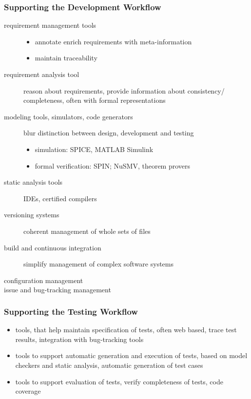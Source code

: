 \documentclass[a4paper, 10pt]{article}
\begin{document}
\subsubsection*{Supporting the Development Workflow}
\begin{description}
    \item[requirement management tools]
    \begin{itemize}
        \item annotate enrich requirements with meta-information
        \item maintain traceability
    \end{itemize}
    \item[requirement analysis tool] reason about requirements, provide information about consistency/ completeness, often with formal representations
    \item[modeling tools, simulators, code generators] blur distinction between design, development and testing
    \begin{itemize}
        \item simulation: SPICE, MATLAB Simulink
        \item formal verification: SPIN; NuSMV, theorem provers
    \end{itemize}
    \item[static analysis tools] IDEs, certified compilers
    \item[versioning systems] coherent management of whole sets of files
    \item[build and continuous integration] simplify management of complex software systems
    \item[configuration management]
    \item[issue and bug-tracking management]
\end{description}

\subsubsection*{Supporting the Testing Workflow}
\begin{itemize}
    \item tools, that help maintain specification of tests, often web based, trace test results, integration with bug-tracking tools
    \item tools to support automatic generation and execution of tests, based on model checkers and static analysis, automatic generation of test cases
    \item tools to support evaluation of tests, verify completeness of tests, code coverage
\end{itemize}
\end{document}
